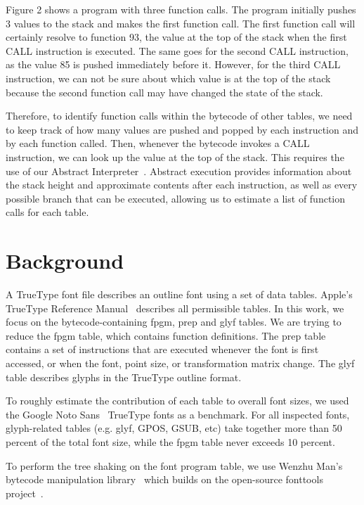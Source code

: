 \documentclass[12pt]{article}
\begin{document}
Figure 2 shows a program with three function calls. The program
initially pushes 3 values to the stack and makes the first function call.
The first function call will certainly resolve to
function 93, the value at the top of the stack
when the first CALL instruction is executed. The same goes for the
second CALL instruction, as the value 85 is pushed immediately before
it. However, for the third CALL instruction, we can not be sure about which
value is at the top of the stack because the second function call may have
changed the state of the stack.  

Therefore, to identify function calls within the bytecode of other tables,
we need to keep track of how many values are pushed and popped by each
instruction and by each function called. Then, whenever the bytecode invokes a CALL instruction,
we can look up the value at the top of the stack. This requires the use of our
Abstract Interpreter~\cite{bytecode}. Abstract
execution provides information about the stack height and approximate contents
after each instruction, as well as every possible branch that can be
executed, allowing us to estimate a list of function calls for each table. 

\section{Background}

A TrueType font file describes an outline font using a set of data tables.
Apple's TrueType Reference
Manual~\cite{ttmanual} describes all permissible tables.
In this work, we focus on the bytecode-containing fpgm, prep and glyf tables.
We are trying to reduce the fpgm table, which contains function definitions. The prep
table contains a set of instructions that are executed whenever the font
is first accessed, or when the font, point size, or transformation matrix
change. The glyf table describes glyphs in the
TrueType outline format.

To roughly estimate the contribution of each table to overall font
sizes, we used the Google Noto Sans~\cite{notosans} TrueType fonts as
a benchmark. For all inspected fonts, glyph-related tables (e.g. glyf, GPOS, GSUB, etc)
take together more than 50 percent of the total font size,
while the fpgm table never exceeds 10 percent.  

To perform the tree shaking on the font program table,
we use
Wenzhu Man's bytecode manipulation library~\cite{bytecode}
which builds on the open-source fonttools project~\cite{fonttools}.
\end{document}
